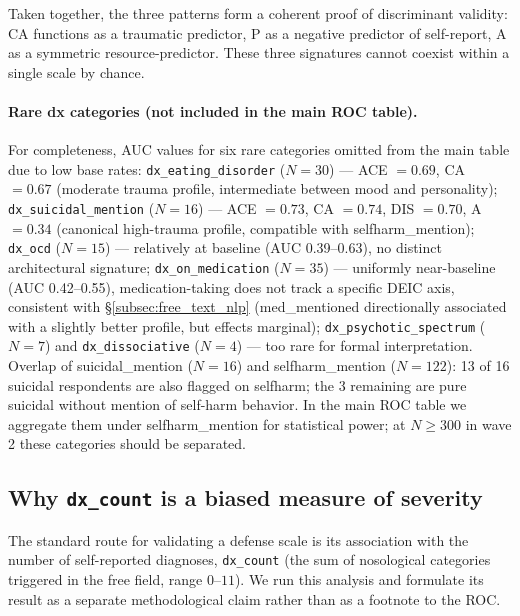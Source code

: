 Taken together, the three patterns form a coherent proof of discriminant validity: CA functions as a traumatic predictor, P as a negative predictor of self-report, A as a symmetric resource-predictor. These three signatures cannot coexist within a single scale by chance.

\paragraph{Rare dx categories (not included in the main ROC table).} For completeness, AUC values for six rare categories omitted from the main table due to low base rates: \texttt{dx\_eating\_disorder} ($N = 30$) --- ACE $= 0.69$, CA $= 0.67$ (moderate trauma profile, intermediate between mood and personality); \texttt{dx\_suicidal\_mention} ($N = 16$) --- ACE $= 0.73$, CA $= 0.74$, DIS $= 0.70$, A $= 0.34$ (canonical high-trauma profile, compatible with selfharm\_mention); \texttt{dx\_ocd} ($N = 15$) --- relatively at baseline (AUC 0.39--0.63), no distinct architectural signature; \texttt{dx\_on\_medication} ($N = 35$) --- uniformly near-baseline (AUC 0.42--0.55), medication-taking does not track a specific DEIC axis, consistent with §\ref{subsec:free_text_nlp} (med\_mentioned directionally associated with a slightly better profile, but effects marginal); \texttt{dx\_psychotic\_spectrum} ($N = 7$) and \texttt{dx\_dissociative} ($N = 4$) --- too rare for formal interpretation. Overlap of suicidal\_mention ($N = 16$) and selfharm\_mention ($N = 122$): 13 of 16 suicidal respondents are also flagged on selfharm; the 3 remaining are pure suicidal without mention of self-harm behavior. In the main ROC table we aggregate them under selfharm\_mention for statistical power; at $N \geq 300$ in wave 2 these categories should be separated.

\subsection{\texorpdfstring{Why \texttt{dx\_count} is a biased measure of severity}{Why dx_count is a biased measure of severity}}
\label{subsec:dx_count_bias}

The standard route for validating a defense scale is its association with the number of self-reported diagnoses, \texttt{dx\_count} (the sum of nosological categories triggered in the free field, range $0$--$11$). We run this analysis and formulate its result as a separate methodological claim rather than as a footnote to the ROC.

